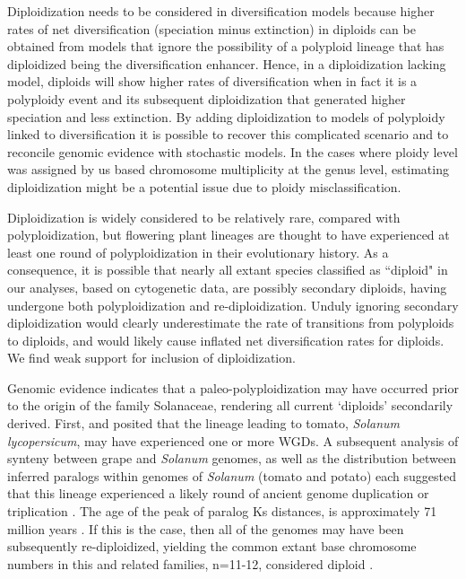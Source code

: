 
Diploidization needs to be considered in diversification models because higher rates of net diversification (speciation minus extinction) in diploids can be obtained from models that ignore the possibility of a polyploid lineage that has diploidized being the diversification enhancer. 
Hence, in a diploidization lacking model, diploids will show higher rates of diversification when in fact it is a polyploidy event and its subsequent diploidization that generated higher speciation and less extinction.  
By adding diploidization to models of polyploidy linked to diversification it is possible to recover this complicated scenario and to reconcile genomic evidence with stochastic models. 
In the cases where ploidy level was assigned by us based chromosome multiplicity at the genus level, estimating diploidization  might be a potential issue due to ploidy misclassification.  


Diploidization is widely considered to be relatively rare, compared with polyploidization, but flowering plant lineages are thought to have experienced at least one round of polyploidization in their evolutionary history. %
As a consequence, it is possible that nearly all extant species classified as ``diploid" in our analyses, based on cytogenetic data, are possibly secondary diploids, having undergone both polyploidization and re-diploidization.
Unduly ignoring secondary diploidization would clearly underestimate the rate of transitions from polyploids to diploids, and would likely cause inflated net diversification rates for diploids.
We find weak support for inclusion of diploidization. %

Genomic evidence indicates that a paleo-polyploidization may have occurred prior to the origin of the family Solanaceae, rendering all current `diploids' secondarily derived. 
First, \citet{ku2000} and \citet{blanc2004} posited that the lineage leading to tomato, \textit{Solanum lycopersicum}, may have experienced one or more WGDs.
A subsequent analysis of synteny between grape and \textit{Solanum} genomes, as well as the distribution between inferred paralogs within genomes of \textit{Solanum} (tomato and potato) each suggested that this lineage experienced a likely round of ancient genome duplication or triplication \citep{tomato2012}. 
The age of the peak of paralog Ks distances, is approximately 71 million years \citep{tomato2012}. 
If this is the case, then all of the genomes may have been subsequently re-diploidized, yielding the common extant base chromosome numbers in this and related families, n=11-12, considered diploid \citep{robertson2011}. 

